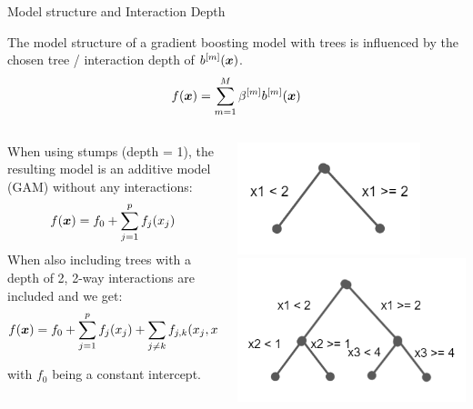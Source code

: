\begin{vbframe}{Model structure and Interaction Depth}

The model structure of a gradient boosting model with trees is influenced by the chosen
tree / interaction depth of $b^{[m]}(\bm{x})$.
$$
f(\bm{x}) =  \sum_{m=1}^M \beta^{[m]} b^{[m]}(\bm{x})
$$

\lz
\begin{footnotesize}
\begin{columns}[T]
\begin{column}{0.6\textwidth}
When using stumps (depth = 1), the resulting model is an additive model (GAM) without any interactions:\\
$$
f(\bm{x}) = f_0 + \sum_{j=1}^p f_j(x_j)
$$
When also including trees with a depth of 2, 2-way interactions are included and we get:\\
$$
f(\bm{x}) = f_0 + \sum_{j=1}^p f_j(x_j) + \sum_{j \neq k} f_{j,k}(x_j, x_k)
$$

with $f_0$ being a constant intercept.
\end{column}
\begin{column}{0.4\textwidth}
\includegraphics[width=0.8\textwidth]{figure/boosting_interact_expl1.PNG}
\includegraphics[width=\textwidth]{figure/boosting_interact_expl2.PNG}
\end{column}
\end{columns}
\end{footnotesize}


\end{vbframe}
